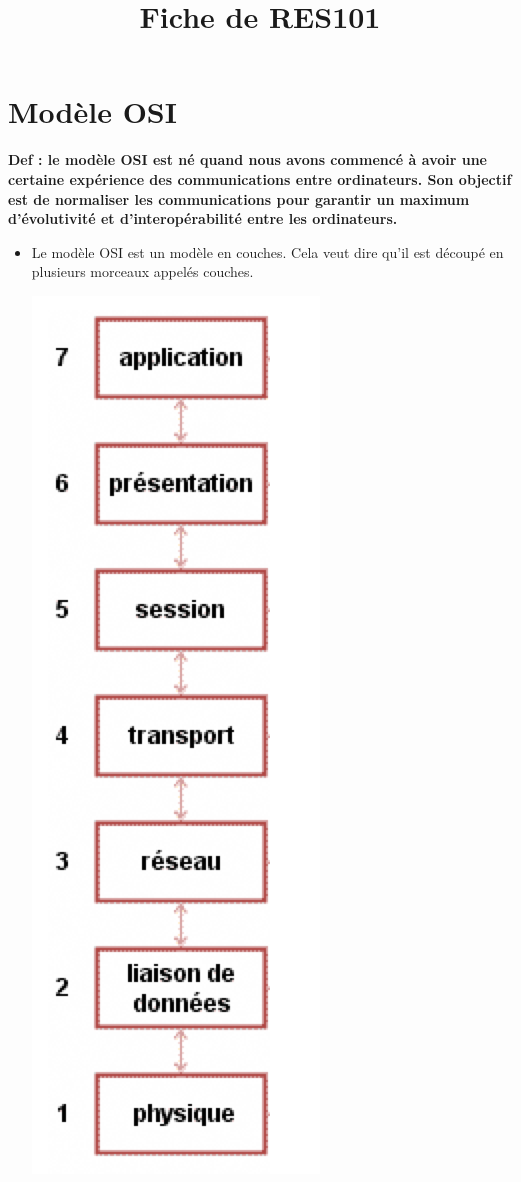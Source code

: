 \documentclass[a4paper,9pt, twocolumn]{article}
\title{\vspace{-1.1cm} \textbf{Fiche de RES101} \vspace{-1.1cm}}
\date{}
\author{}
\begin{document}
\maketitle

\section*{Modèle OSI}

	\textbf{Def : le modèle OSI est né quand nous avons commencé à avoir une certaine expérience des communications entre ordinateurs. Son objectif est de normaliser les communications pour garantir un maximum d'évolutivité et d'interopérabilité entre les ordinateurs.}
	
	\begin{itemize}
		\item Le modèle OSI est un modèle en couches. Cela veut dire qu'il est découpé en plusieurs morceaux appelés couches.
		\begin{center}
		\includegraphics[scale=0.4]{couches.png}

\end{center}
\end{itemize}
\end{document}
